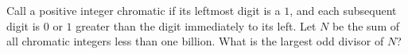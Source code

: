 Call a positive integer chromatic if its leftmost digit is a $1$, and each subsequent digit is $0$ or $1$ greater than the digit immediately to its left. Let $N$ be the sum of all chromatic integers less than one billion. What is the largest odd divisor of $N$?
